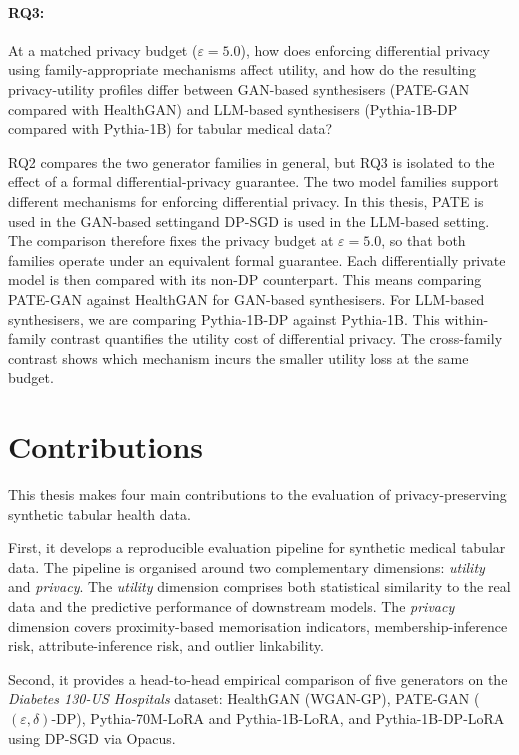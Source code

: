 \paragraph{RQ3:}
\label{rq:rq3} At a matched privacy budget ($\varepsilon = 5.0$), how does enforcing
differential privacy using family-appropriate mechanisms affect utility, and
how do the resulting privacy-utility profiles differ between GAN-based
synthesisers (PATE-GAN compared with HealthGAN) and LLM-based synthesisers
(Pythia-1B-DP compared with Pythia-1B) for tabular medical data?

RQ2 compares the two generator families in general, but RQ3 is isolated to the
effect of a formal differential-privacy guarantee. The two model families support 
different mechanisms for enforcing differential
privacy. In this thesis, PATE is used in the GAN-based settingand DP-SGD is used in the
LLM-based setting. The comparison therefore fixes the privacy budget at
$\varepsilon = 5.0$, so that both families operate under an equivalent formal
guarantee. Each differentially private model is then compared with its
non-DP counterpart. This means comparing 
PATE-GAN against HealthGAN for GAN-based synthesisers. For LLM-based synthesisers, 
we are comparing Pythia-1B-DP against Pythia-1B. 
This within-family contrast quantifies the utility cost of
differential privacy. The cross-family contrast shows which mechanism incurs
the smaller utility loss at the same budget.

\section{Contributions}
\label{sec:intro:contributions}

This thesis makes four main contributions to the evaluation of
privacy-preserving synthetic tabular health data.

First, it develops a reproducible evaluation pipeline for synthetic medical
tabular data. The pipeline is organised around two complementary dimensions:
\emph{utility} and \emph{privacy}. The \emph{utility} dimension comprises
both statistical similarity to the real data and the
predictive performance of downstream models. The \emph{privacy} dimension covers
proximity-based memorisation indicators, membership-inference risk,
attribute-inference risk, and outlier linkability.

Second, it provides a head-to-head empirical comparison of five generators on
the \emph{Diabetes 130-US Hospitals} dataset: HealthGAN
(WGAN-GP), PATE-GAN
($(\varepsilon,\delta)$-DP), Pythia-70M-LoRA and
Pythia-1B-LoRA, and
Pythia-1B-DP-LoRA using DP-SGD via
Opacus.

